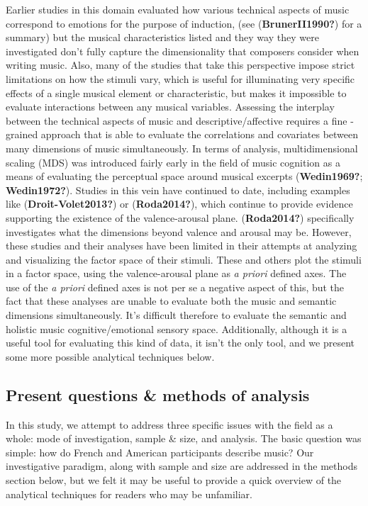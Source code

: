 \documentclass[
  english,
  man,floatsintext]{apa6}
\begin{document}
Earlier studies in this domain evaluated how various technical aspects of music correspond to emotions for the purpose of induction, (see (\textbf{BrunerII1990?}) for a summary) but the musical characteristics listed and they way they were investigated don't fully capture the dimensionality that composers consider when writing music. Also, many of the studies that take this perspective impose strict limitations on how the stimuli vary, which is useful for illuminating very specific effects of a single musical element or characteristic, but makes it impossible to evaluate interactions between any musical variables. Assessing the interplay between the technical aspects of music and descriptive/affective requires a fine - grained approach that is able to evaluate the correlations and covariates between many dimensions of music simultaneously.
In terms of analysis, multidimensional scaling (MDS) was introduced fairly early in the field of music cognition as a means of evaluating the perceptual space around musical excerpts (\textbf{Wedin1969?}; \textbf{Wedin1972?}). Studies in this vein have continued to date, including examples like (\textbf{Droit-Volet2013?}) or (\textbf{Roda2014?}), which continue to provide evidence supporting the existence of the valence-arousal plane. (\textbf{Roda2014?}) specifically investigates what the dimensions beyond valence and arousal may be. However, these studies and their analyses have been limited in their attempts at analyzing and visualizing the factor space of their stimuli. These and others plot the stimuli in a factor space, using the valence-arousal plane as \emph{a priori} defined axes. The use of the \emph{a priori} defined axes is not per se a negative aspect of this, but the fact that these analyses are unable to evaluate both the music and semantic dimensions simultaneously. It's difficult therefore to evaluate the semantic and holistic music cognitive/emotional sensory space. Additionally, although it is a useful tool for evaluating this kind of data, it isn't the only tool, and we present some more possible analytical techniques below.

\hypertarget{present-questions-methods-of-analysis}{%
\subsection{Present questions \& methods of analysis}\label{present-questions-methods-of-analysis}}

In this study, we attempt to address three specific issues with the field as a whole: mode of investigation, sample \& size, and analysis. The basic question was simple: how do French and American participants describe music? Our investigative paradigm, along with sample and size are addressed in the methods section below, but we felt it may be useful to provide a quick overview of the analytical techniques for readers who may be unfamiliar.
\end{document}
